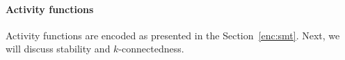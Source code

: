 \paragraph{Activity functions}
%
Activity functions are encoded as presented in the Section~\ref{enc:smt}.
%
%
%
%
%
%
%
Next, we will discuss stability and $k$-connectedness.
%

